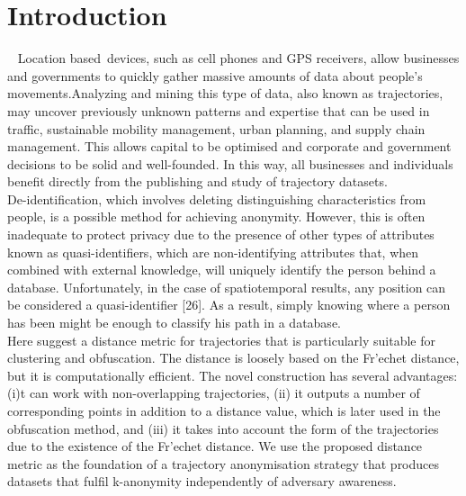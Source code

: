 \section{Introduction}~\label{sec:introduction}
Location based devices, such as cell phones and GPS receivers, allow businesses and governments to quickly gather massive amounts of data about people's movements.Analyzing and mining this type of data, also known as trajectories, may uncover previously unknown patterns and expertise that can be used in traffic, sustainable mobility management, urban planning, and supply chain management. This allows capital to be optimised and corporate and government decisions to be solid and well-founded. In this way, all businesses and individuals benefit directly from the publishing and study of trajectory datasets.\\
De-identification, which involves deleting distinguishing characteristics from people, is a possible method for achieving anonymity. However, this is often inadequate to protect privacy due to the presence of other types of attributes known as quasi-identifiers, which are non-identifying attributes that, when combined with external knowledge, will uniquely identify the person behind a database. Unfortunately, in the case of spatiotemporal results, any position can be considered a quasi-identifier [26].
As a result, simply knowing where a person has been might be enough to classify his path in a database.\\
Here suggest a distance metric for trajectories that is particularly suitable for clustering and obfuscation. The distance is loosely based on the Fr'echet distance, but it is computationally efficient. The novel construction has several advantages: (i)t can work with non-overlapping trajectories, (ii) it outputs a number of corresponding points in addition to a distance value, which is later used in the obfuscation method, and (iii) it takes into account the form of the trajectories due to the existence of the Fr'echet distance. We use the proposed distance metric as the foundation of a trajectory anonymisation strategy that produces datasets that fulfil k-anonymity independently of adversary awareness.

